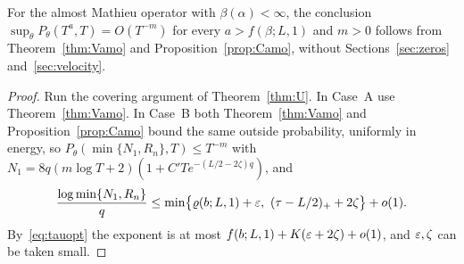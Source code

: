 \begin{corollary}\label{cor:amo2}
For the almost Mathieu operator with $\beta(\alpha)<\infty$, the conclusion $\sup_\theta P_\theta(T^a,T)=O(T^{-m})$ for every $a>f(\beta;L,1)$ and $m>0$ follows from Theorem~\ref{thm:Vamo} and Proposition~\ref{prop:Camo}, without Sections~\ref{sec:zeros} and~\ref{sec:velocity}.
\end{corollary}

\begin{proof}
Run the covering argument of Theorem~\ref{thm:U}. In Case~A use Theorem~\ref{thm:Vamo}. In Case~B both Theorem~\ref{thm:Vamo} and Proposition~\ref{prop:Camo} bound the same outside probability, uniformly in energy, so $P_\theta(\min\{N_1,R_n\},T)\le T^{-m}$ with $N_1=8q(m\log T+2)(1+C'Te^{-(L/2-2\zeta)q})$, and
\[
\frac{\log\min\{N_1,R_n\}}q\le\min\bigl\{\varrho(b;L,1)+\eps,\ (\tau-L/2)_++2\zeta\bigr\}+o(1).
\]
By~\eqref{eq:tauopt} the exponent is at most $f(b;L,1)+K(\varepsilon+2\zeta)+o(1)$, and $\varepsilon,\zeta$ can be taken small.
\end{proof}
